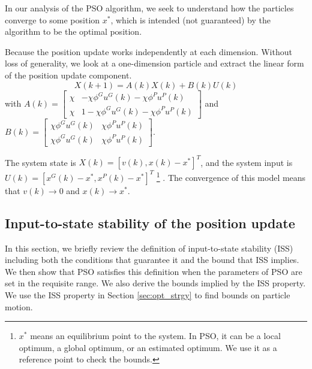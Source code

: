 In our analysis of the PSO algorithm, we seek to understand how the particles converge to some position $ x^{*} $, which is intended (not guaranteed) by the algorithm to be the optimal position.

Because the position update works independently at each dimension.
Without loss of generality, we look at a one-dimension particle and extract the linear form of the position update component.
\begin{equation}
\label{eq:pso_up_linalg_simp}
X(k+1) = A(k) X(k) + B(k) U(k)
\end{equation}
with
$ A(k) = \begin{bmatrix}
\chi & - \chi \phi^{G} u^{G}(k) - \chi \phi^{P} u^{P}(k)
\\ 
\chi & 1 - \chi \phi^{G} u^{G}(k) - \chi \phi^{P} u^{P}(k)
\end{bmatrix} $
and
$ B(k) = \begin{bmatrix}
\chi \phi^{G} u^{G}(k) & \chi \phi^{P} u^{P}(k)
\\ 
\chi \phi^{G} u^{G}(k) & \chi \phi^{P} u^{P}(k)
\end{bmatrix} $.

The system state is $ X(k) = [ v(k), x(k) - x^{*} ]^{T} $, and the system input is $ U(k) = [ x^{G}(k) - x^{*} , x^{P}(k) - x^{*} ]^{T} $
\footnote{$ x^{*} $ means an equilibrium point to the system.
In PSO, it can be a local optimum, a global optimum, or an estimated optimum.
We use it as a reference point to check the bounds.}
.
The convergence of this model means that $ v(k) \rightarrow 0 $ and $ x(k) \rightarrow x^{*} $.

\subsection{Input-to-state stability of the position update}

In this section, we briefly review the definition of input-to-state stability (ISS) including both the conditions that guarantee it and the bound that ISS implies\cite{Jiang2001857}. 
We then show that PSO satisfies this definition when the parameters of PSO are set in the requisite range. We also derive the bounds implied by the ISS property.
We use the ISS property in Section \ref{sec:opt_strgy} to find bounds on particle motion.

